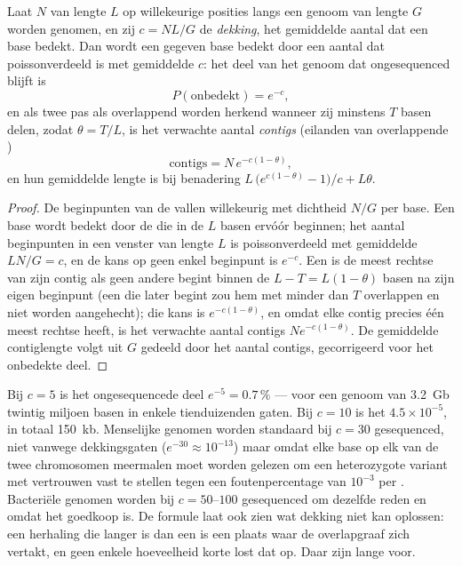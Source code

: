 \begin{theorem}\label{thm:b3:genomics:lander-waterman}
Laat $N$  van lengte $L$ op willekeurige posities langs een genoom
van lengte $G$ worden genomen, en zij $c = NL/G$ de \emph{dekking}, het
gemiddelde aantal  dat een base bedekt. Dan wordt een gegeven base
bedekt door een aantal  dat poissonverdeeld is met gemiddelde $c$:
het deel van het genoom dat ongesequenced blijft is
\[
P(\text{onbedekt}) = e^{-c},
\]
en als twee  pas als overlappend worden herkend wanneer zij
minstens $T$ basen delen, zodat $\theta = T/L$, is het verwachte aantal
\emph{contigs} (eilanden van overlappende )
\[
\text{contigs} = N\,e^{-c(1-\theta)},
\]
en hun gemiddelde lengte is bij benadering
$L\,\bigl(e^{c(1-\theta)} - 1\bigr)/c + L\theta$.
\end{theorem}
\begin{proof}
De beginpunten van de  vallen willekeurig met dichtheid $N/G$ per
base. Een base wordt bedekt door de  die in de $L$ basen ervóór
beginnen; het aantal beginpunten in een venster van lengte $L$ is
poissonverdeeld met gemiddelde $LN/G
= c$, en de kans op geen enkel beginpunt is $e^{-c}$. Een  is de
meest rechtse van zijn contig als geen andere  begint binnen de
$L - T = L(1-\theta)$ basen na zijn eigen beginpunt (een  die later
begint zou hem met minder dan $T$ overlappen en niet worden
aangehecht); die kans is $e^{-c(1-\theta)}$, en omdat elke contig
precies één meest rechtse  heeft, is het verwachte aantal contigs
$N e^{-c(1-\theta)}$. De gemiddelde contiglengte volgt uit $G$ gedeeld
door het aantal contigs, gecorrigeerd voor het onbedekte deel.
\end{proof}

\begin{example}\label{ex:b3:genomics:coverage}
Bij $c = 5$ is het ongesequencede deel $e^{-5} = 0.7\,\%$ --- voor een
genoom van \qty{3.2}{Gb} twintig miljoen basen in enkele tienduizenden
gaten. Bij $c = 10$ is het $4.5\times 10^{-5}$, in totaal
\qty{150}{kb}. Menselijke genomen worden standaard bij $c = 30$
gesequenced, niet vanwege dekkingsgaten ($e^{-30} \approx 10^{-13}$)
maar omdat elke base op elk van de twee chromosomen meermalen moet
worden gelezen om een heterozygote variant met vertrouwen vast te
stellen tegen een foutenpercentage van $10^{-3}$ per . Bacteriële
genomen worden bij $c = 50$--$100$ gesequenced om dezelfde reden en
omdat het goedkoop is. De formule laat ook zien wat dekking niet kan
oplossen: een herhaling die langer is dan een  is een plaats waar
de overlapgraaf zich vertakt, en geen enkele hoeveelheid korte 
lost dat op. Daar zijn lange  voor.
\end{example}

